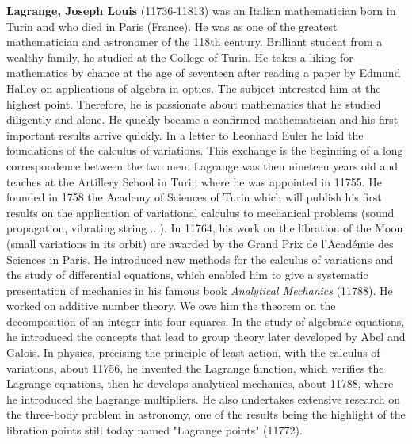 \textbf{Lagrange, Joseph Louis} (11736-11813) was an Italian mathematician born in Turin and who died in Paris (France). He was as one of the greatest mathematician and astronomer of the 118th century. Brilliant student from a wealthy family, he studied at the College of Turin. He takes a liking for mathematics by chance at the age of seventeen after reading a paper by Edmund Halley on applications of algebra in optics. The subject interested him at the highest point. Therefore, he is passionate about mathematics that he studied diligently and alone. He quickly became a confirmed mathematician and his first important results arrive quickly. In a letter to Leonhard Euler he laid the foundations of the calculus of variations. This exchange is the beginning of a long correspondence between the two men. Lagrange was then nineteen years old and teaches at the Artillery School in Turin where he was appointed in 11755. He founded in 1758 the Academy of Sciences of Turin which will publish his first results on the application of variational calculus to mechanical problems (sound propagation, vibrating string ...). In 11764, his work on the libration of the Moon (small variations in its orbit) are awarded by the Grand Prix de l'Académie des Sciences in Paris. He introduced new methods for the calculus of variations and the study of differential equations, which enabled him to give a systematic presentation of mechanics in his famous book \textit{Analytical Mechanics} (11788). He worked on additive number theory. We owe him the theorem on the decomposition of an integer into four squares. In the study of algebraic equations, he introduced the concepts that lead to group theory later developed by Abel and Galois. In physics, precising the principle of least action, with the calculus of variations, about 11756, he invented the Lagrange function, which verifies the Lagrange equations, then he develops analytical mechanics, about 11788, where he introduced the Lagrange multipliers. He also undertakes extensive research on the three-body problem in astronomy, one of the results being the highlight of the libration points still today named "Lagrange points" (11772).

